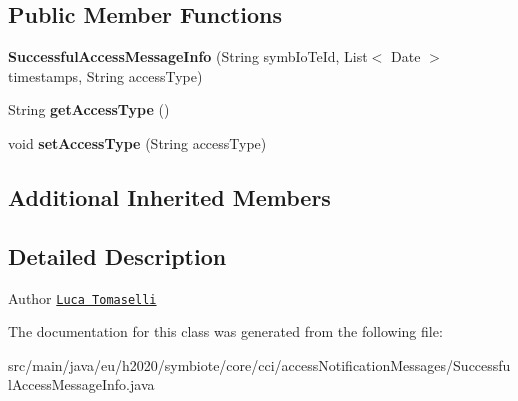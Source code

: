 \subsection*{Public Member Functions}
\begin{DoxyCompactItemize}
\item 
\mbox{\label{classeu_1_1h2020_1_1symbiote_1_1core_1_1cci_1_1accessNotificationMessages_1_1SuccessfulAccessMessageInfo_ab0d2c09b1ab9cd4d8e9008be9e8bad0e}} 
{\bfseries Successful\+Access\+Message\+Info} (String symb\+Io\+Te\+Id, List$<$ Date $>$ timestamps, String access\+Type)
\item 
\mbox{\label{classeu_1_1h2020_1_1symbiote_1_1core_1_1cci_1_1accessNotificationMessages_1_1SuccessfulAccessMessageInfo_a5a60a20329bd74eec54537f574a14c6b}} 
String {\bfseries get\+Access\+Type} ()
\item 
\mbox{\label{classeu_1_1h2020_1_1symbiote_1_1core_1_1cci_1_1accessNotificationMessages_1_1SuccessfulAccessMessageInfo_a8a03519baccd95556bda7a11bb136cba}} 
void {\bfseries set\+Access\+Type} (String access\+Type)
\end{DoxyCompactItemize}
\subsection*{Additional Inherited Members}


\subsection{Detailed Description}
\begin{DoxyAuthor}{Author}
\href{mailto:l.tomaselli@nextworks.it}{\tt Luca Tomaselli} 
\end{DoxyAuthor}


The documentation for this class was generated from the following file\+:\begin{DoxyCompactItemize}
\item 
src/main/java/eu/h2020/symbiote/core/cci/access\+Notification\+Messages/Successful\+Access\+Message\+Info.\+java\end{DoxyCompactItemize}
